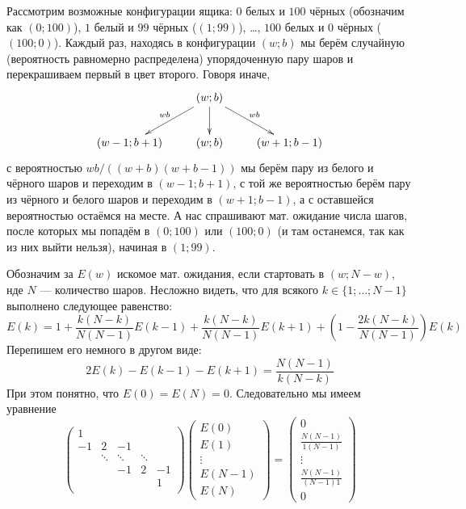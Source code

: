 \documentclass[12pt,a4paper]{article}
\begin{document}
    \begin{enumproblem}
        Рассмотрим возможные конфигурации ящика: $0$ белых и $100$ чёрных (обозначим как $(0; 100)$), $1$ белый и $99$ чёрных ($(1; 99)$), \dots, $100$ белых и $0$ чёрных ($(100; 0)$). Каждый раз, находясь в конфигурации $(w; b)$ мы берём случайную (вероятность равномерно распределена) упорядоченную пару шаров и перекрашиваем первый в цвет второго. Говоря иначе,
        \[
            \xymatrix{
                & {(w; b)} \ar[dl]_{wb} \ar[dr]^{wb} \ar[d] &\\
                {(w-1; b+1)} & {(w; b)} & {(w+1; b-1)}
            }
        \]
        с вероятностью $wb/((w+b)(w+b-1))$ мы берём пару из белого и чёрного шаров и переходим в $(w-1; b+1)$, с той же вероятностью берём пару из чёрного и белого шаров и переходим в $(w+1; b-1)$, а с оставшейся вероятностью остаёмся на месте. А нас спрашивают мат. ожидание числа шагов, после которых мы попадём в $(0; 100)$ или $(100; 0)$ (и там останемся, так как из них выйти нельзя), начиная в $(1; 99)$.

        Обозначим за $E(w)$ искомое мат. ожидания, если стартовать в $(w; N - w)$, нде $N$ --- количество шаров. Несложно видеть, что для всякого $k \in \{1; \dots; N-1\}$ выполнено следующее равенство:
        \[E(k) = 1 + \frac{k(N-k)}{N(N-1)} E(k-1) + \frac{k(N-k)}{N(N-1)} E(k+1) + \left(1-\frac{2k(N-k)}{N(N-1)}\right) E(k)\]
        Перепишем его немного в другом виде:
        \[2E(k) - E(k-1) - E(k+1) = \frac{N(N-1)}{k(N-k)}\]
        При этом понятно, что $E(0) = E(N) = 0$. Следовательно мы имеем уравнение
        \[
            \begin{pmatrix}
                1\\
                -1& 2& -1\\
                & \ddots& \ddots& \ddots\\
                && -1& 2& -1\\
                &&&& 1\\
            \end{pmatrix}
            \begin{pmatrix}
                E(0)\\ E(1)\\ \vdots\\ E(N-1)\\ E(N)
            \end{pmatrix}
            =
            \begin{pmatrix}
                0\\ \frac{N(N-1)}{1(N-1)}\\ \vdots\\ \frac{N(N-1)}{(N-1)1}\\ 0
            \end{pmatrix}
        \]
        

\end{enumproblem}
\end{document}
